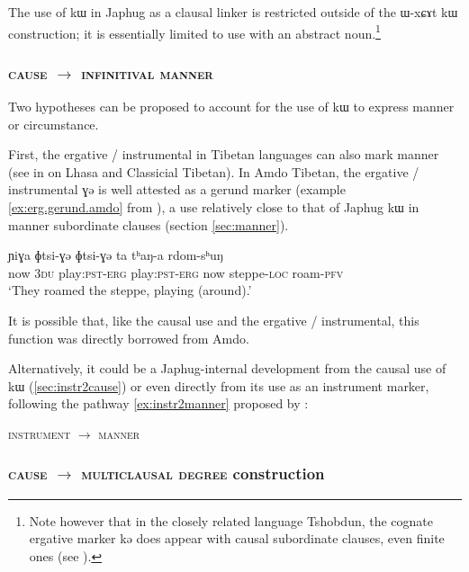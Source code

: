 \documentclass[oldfontcommands,oneside,a4paper,11pt]{article}
\newcommand{\ipa}[1]{{\phon #1}} %
\begin{document}
The use of  \ipa{kɯ} in Japhug as a clausal linker is restricted outside of the  \ipa{ɯ-xɕɤt kɯ} construction; it is essentially limited to use with an abstract noun.\footnote{Note however that in the closely related language Tshobdun, the cognate ergative marker \ipa{kə} does appear with causal subordinate clauses, even finite ones (see \citealt[479]{sun12complementation}).}
 
 \subsubsection{\textsc{cause} $\rightarrow$ \textsc{infinitival manner}}
Two hypotheses can be proposed to account for the  use of  \ipa{kɯ} to express manner or circumstance.

First,   the ergative / instrumental in Tibetan languages can also mark manner (see in  \citealt[128]{tounadre96erg} on Lhasa and Classicial Tibetan). In Amdo Tibetan, the ergative / instrumental \ipa{ɣə} is well attested as a gerund marker (example \ref{ex:erg.gerund.amdo} from \citealt[162; 167]{haller04themchen}), a use relatively close to that of Japhug \ipa{kɯ} in manner subordinate clauses (section \ref{sec:manner}).

 \begin{exe} 
\ex \label{ex:erg.gerund.amdo}
\gll   \ipa{ta} 	\ipa{ɲiɣa} 	\ipa{ɸtsi-ɣə} 	\ipa{ɸtsi-ɣə} 	\ipa{ta} 	\ipa{tʰaŋ-a} 	\ipa{rdom-sʰuŋ}  \\
now \textsc{3du} play:\textsc{pst}-\textsc{erg} play:\textsc{pst}-\textsc{erg} now steppe-\textsc{loc} roam-\textsc{pfv} \\
\glt  `They roamed the steppe, playing (around).'
\end{exe}  

It is possible that, like the causal use and the ergative / instrumental, this function was directly borrowed from Amdo.

Alternatively, it could be a Japhug-internal development from the causal use of \ipa{kɯ}  (\ref{sec:instr2cause}) or even directly from its use as an instrument marker, following the pathway \ref{ex:instr2manner} proposed by \citet[180]{heine-kuteva02}:
   \begin{exe}
\ex \label{ex:instr2manner}
\glt \textsc{instrument} $\rightarrow$ \textsc{manner} 
\end{exe}

 

\subsubsection{\textsc{cause} $\rightarrow$ \textsc{multiclausal degree} construction} \label{sec:cause2degree}
\end{document}
